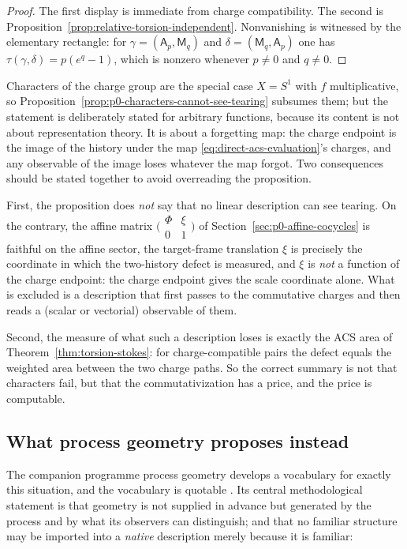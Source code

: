 \begin{proof}
The first display is immediate from charge compatibility.  The second is
Proposition~\ref{prop:relative-torsion-independent}.  Nonvanishing is witnessed
by the elementary rectangle: for $\gamma=(\mathsf A_p,\mathsf M_q)$ and
$\delta=(\mathsf M_q,\mathsf A_p)$ one has $\tau(\gamma,\delta)=p(e^{q}-1)$,
which is nonzero whenever $p\ne0$ and $q\ne0$.
\end{proof}

Characters of the charge group are the special case $X=S^1$ with $f$
multiplicative, so Proposition~\ref{prop:p0-characters-cannot-see-tearing}
subsumes them; but the statement is deliberately stated for arbitrary functions,
because its content is not about representation theory.  It is about a
forgetting map: the charge endpoint is the image of the history under the
map \eqref{eq:direct-acs-evaluation}'s charges, and any observable of the image
loses whatever the map forgot.  Two consequences should be stated together to
avoid overreading the proposition.

First, the proposition does \emph{not} say that no linear description can see
tearing.  On the contrary, the affine matrix
$\bigl(\begin{smallmatrix}\Phi&\xi\\0&1\end{smallmatrix}\bigr)$ of
Section~\ref{sec:p0-affine-cocycles} is faithful on the affine sector, the
target-frame translation $\xi$ is precisely the coordinate in which the
two-history defect is measured, and $\xi$ is \emph{not} a function of the charge
endpoint: the charge endpoint gives the scale coordinate alone.  What is
excluded is a description that first passes to the commutative charges and then
reads a (scalar or vectorial) observable of them.

Second, the measure of what such a description loses is exactly the ACS area of
Theorem~\ref{thm:torsion-stokes}: for charge-compatible pairs the defect equals
the weighted area between the two charge paths.  So the correct summary is not
that characters fail, but that the commutativization has a price, and the price
is computable.

\subsection{What process geometry proposes instead}
\label{subsec:p0-beyond-linear-proposals}

The companion programme process geometry develops a vocabulary for exactly this
situation, and the vocabulary is quotable \cite{Yuan2026ProcessGeometry}.  Its
central methodological statement is that geometry is not supplied in advance but
generated by the process and by what its observers can distinguish; and that no
familiar structure may be imported into a \emph{native} description merely because it
is familiar:

